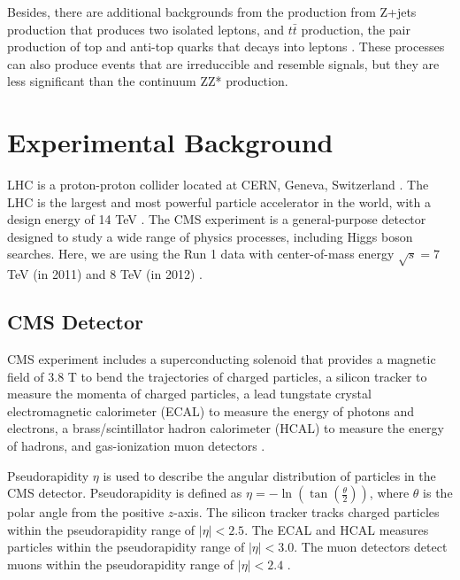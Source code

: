 Besides, there are additional backgrounds from the production from Z+jets production that produces two isolated leptons, and $t\bar{t}$ production, the pair production of top and anti-top quarks that decays into leptons \cite{Hu2020HiggsTo4L}. These processes can also produce events that are irreduccible and resemble signals, but they are less significant than the continuum ZZ* production. 


\section{Experimental Background}
LHC is a proton-proton collider located at CERN, Geneva, Switzerland \cite{CMS:2012qbp}. The LHC is the largest and most powerful particle accelerator in the world, with a design energy of 14 TeV \cite{CMS:2012qbp}. The CMS experiment is a general-purpose detector designed to study a wide range of physics processes, including Higgs boson searches. Here, we are using the Run 1 data with center-of-mass energy $\sqrt{s} = 7$ TeV (in 2011) and $8$ TeV (in 2012) \cite{CMS_2010_data,MIT:Higgs4L2020,Hu2020HiggsTo4L,CMS:2012qbp}.

\subsection{CMS Detector}
CMS experiment includes a superconducting solenoid that provides a magnetic field of 3.8 T to bend the trajectories of charged particles, a silicon tracker to measure the momenta of charged particles, a lead tungstate crystal electromagnetic calorimeter (ECAL) to measure the energy of photons and electrons, a brass/scintillator hadron calorimeter (HCAL) to measure the energy of hadrons, and gas-ionization muon detectors \cite{CMS:2012qbp}. 

Pseudorapidity $\eta$ is used to describe the angular distribution of particles in the CMS detector. Pseudorapidity is defined as $\eta=-\ln(\tan(\frac{\theta}{2}))$, where $\theta$ is the polar angle from the positive $z$-axis. The silicon tracker tracks charged particles within the pseudorapidity range of $|\eta| < 2.5$. The ECAL and HCAL measures particles within the pseudorapidity range of $|\eta| < 3.0$. The muon detectors detect muons within the pseudorapidity range of $|\eta| < 2.4$ \cite{CMS:2012qbp}. 


